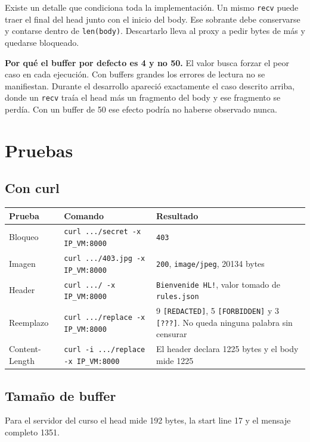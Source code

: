 \documentclass[11pt,a4paper]{article}
\newcommand{\cabtabla}[1]{\rowcolor{filahead}\textbf{#1}}
\begin{document}
\medskip
\noindent Existe un detalle que condiciona toda la implementación. Un mismo \texttt{recv} puede
traer el final del head junto con el inicio del body. Ese sobrante debe conservarse y contarse
dentro de \texttt{len(body)}. Descartarlo lleva al proxy a pedir bytes de más y quedarse bloqueado.

\medskip
\noindent\textbf{Por qué el buffer por defecto es 4 y no 50.} El valor busca forzar el peor caso en
cada ejecución. Con buffers grandes los errores de lectura no se manifiestan. Durante el desarrollo
apareció exactamente el caso descrito arriba, donde un \texttt{recv} traía el head más un fragmento
del body y ese fragmento se perdía. Con un buffer de 50 ese efecto podría no haberse observado
nunca.

\section{Pruebas}

\subsection{Con curl}

\begin{tabularx}{\textwidth}{@{}l X X@{}}
\toprule
\cabtabla{Prueba} & \cabtabla{Comando} & \cabtabla{Resultado} \\
\midrule
Bloqueo & \texttt{curl .../secret -x IP\_VM:8000} & \texttt{403} \\
\addlinespace
Imagen & \texttt{curl .../403.jpg -x IP\_VM:8000} & \texttt{200}, \texttt{image/jpeg}, 20134 bytes \\
\addlinespace
Header & \texttt{curl .../ -x IP\_VM:8000} & \texttt{Bienvenide HL!}, valor tomado de \texttt{rules.json} \\
\addlinespace
Reemplazo & \texttt{curl .../replace -x IP\_VM:8000} & 9 \texttt{[REDACTED]}, 5 \texttt{[FORBIDDEN]}
y 3 \texttt{[???]}. No queda ninguna palabra sin censurar \\
\addlinespace
Content-Length & \texttt{curl -i .../replace -x IP\_VM:8000} & El header declara 1225 bytes y el
body mide 1225 \\
\bottomrule
\end{tabularx}

\subsection{Tamaño de buffer}

Para el servidor del curso el head mide 192 bytes, la start line 17 y el mensaje completo 1351.
\end{document}
